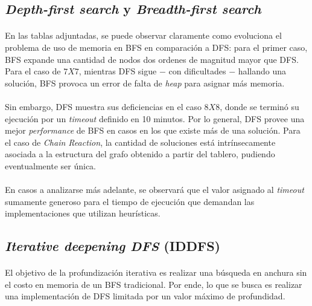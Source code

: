 \documentclass[12pt, twocolumn]{article}
\begin{document}
	\subsection[DFS y BFS]{\textit{Depth-first search} y \textit{Breadth-first search}}
	
	\paragraph{} En las tablas adjuntadas, se puede observar claramente como evoluciona el problema de uso de memoria en BFS en comparación a DFS: para el primer caso, BFS expande una cantidad de nodos dos ordenes de magnitud mayor que DFS. Para el caso de $7X7$, mientras DFS sigue $-$ con dificultades $-$ hallando una solución, BFS provoca un error de falta de \textit{heap} para asignar más memoria. 	
	
	\paragraph{} Sin embargo, DFS muestra sus deficiencias en el caso $8X8$, donde se terminó su ejecución por un \textit{timeout} definido en 10 minutos. Por lo general, DFS provee una mejor \textit{performance} de BFS en casos en los que existe más de una solución. Para el caso de \textit{Chain Reaction}, la cantidad de soluciones está intrínsecamente asociada a la estructura del grafo obtenido a partir del tablero, pudiendo eventualmente ser única.  
	
	\paragraph{} En casos a analizarse más adelante, se observará que el valor asignado al \textit{timeout} sumamente generoso para el tiempo de ejecución que demandan las implementaciones que utilizan heurísticas.
	
	\subsection[IDDFS]{\textit{Iterative deepening DFS} (IDDFS)}
	
	\paragraph{} El objetivo de la profundización iterativa es realizar una búsqueda en anchura sin el costo en memoria de un BFS tradicional. Por ende, lo que se busca es realizar una implementación de DFS limitada por un valor máximo de profundidad.
	
\end{document}
